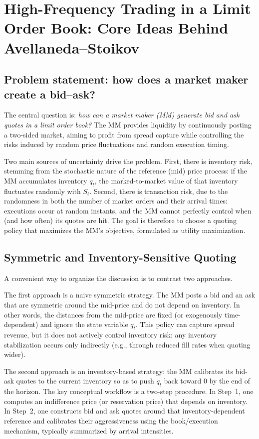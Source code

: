 \section{High-Frequency Trading in a Limit Order Book: Core Ideas Behind Avellaneda--Stoikov}
\label{hft1-sec:hft_lob_core_ideas}


\subsection{Problem statement: how does a market maker create a bid--ask?}
The central question is: \emph{how can a market maker (MM) generate bid and ask quotes in a limit order book?} The MM provides liquidity by continuously posting a two-sided market, aiming to profit from spread capture while controlling the risks induced by random price fluctuations and random execution timing.

Two main sources of uncertainty drive the problem. First, there is inventory risk, stemming from the stochastic nature of the reference (mid) price process: if the MM accumulates inventory $q_t$, the marked-to-market value of that inventory fluctuates randomly with $S_t$. Second, there is transaction risk, due to the randomness in both the number of market orders and their arrival times: executions occur at random instants, and the MM cannot perfectly control when (and how often) its quotes are hit. The goal is therefore to choose a quoting policy that maximizes the MM's objective, formulated as utility maximization.

\subsection{Symmetric and Inventory-Sensitive Quoting}
A convenient way to organize the discussion is to contrast two approaches.

The first approach is a naive symmetric strategy. The MM posts a bid and an ask that are symmetric around the mid-price and do not depend on inventory. In other words, the distances from the mid-price are fixed (or exogenously time-dependent) and ignore the state variable $q_t$. This policy can capture spread revenue, but it does not actively control inventory risk: any inventory stabilization occurs only indirectly (e.g., through reduced fill rates when quoting wider).

The second approach is an inventory-based strategy: the MM calibrates its bid-ask quotes to the current inventory so as to push $q_t$ back toward $0$ by the end of the horizon. The key conceptual workflow is a two-step procedure. In Step~1, one computes an indifference price (or reservation price) that depends on inventory. In Step~2, one constructs bid and ask quotes around that inventory-dependent reference and calibrates their aggressiveness using the book/execution mechanism, typically summarized by arrival intensities.

